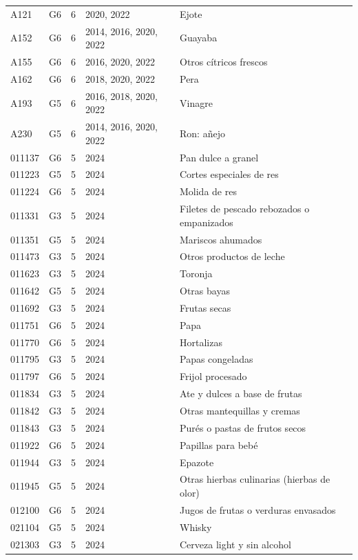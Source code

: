 \begin{table}[ht]
\begin{tabular}{llrll}
  A121 & G6 &   6 & 2020, 2022 & Ejote \\ 
  A152 & G6 &   6 & 2014, 2016, 2020, 2022 & Guayaba \\ 
  A155 & G6 &   6 & 2016, 2020, 2022 & Otros cítricos frescos \\ 
  A162 & G6 &   6 & 2018, 2020, 2022 & Pera \\ 
  A193 & G5 &   6 & 2016, 2018, 2020, 2022 & Vinagre \\ 
  A230 & G5 &   6 & 2014, 2016, 2020, 2022 & Ron: añejo \\ 
  011137 & G6 &   5 & 2024 & Pan dulce a granel \\ 
  011223 & G5 &   5 & 2024 & Cortes especiales de res \\ 
  011224 & G6 &   5 & 2024 & Molida de res \\ 
  011331 & G3 &   5 & 2024 & Filetes de pescado rebozados o empanizados \\ 
  011351 & G5 &   5 & 2024 & Mariscos ahumados \\ 
  011473 & G3 &   5 & 2024 & Otros productos de leche \\ 
  011623 & G3 &   5 & 2024 & Toronja \\ 
  011642 & G5 &   5 & 2024 & Otras bayas \\ 
  011692 & G3 &   5 & 2024 & Frutas secas \\ 
  011751 & G6 &   5 & 2024 & Papa \\ 
  011770 & G6 &   5 & 2024 & Hortalizas \\ 
  011795 & G3 &   5 & 2024 & Papas congeladas \\ 
  011797 & G6 &   5 & 2024 & Frijol procesado \\ 
  011834 & G3 &   5 & 2024 & Ate y dulces a base de frutas \\ 
  011842 & G3 &   5 & 2024 & Otras mantequillas y cremas \\ 
  011843 & G3 &   5 & 2024 & Purés o pastas de frutos secos \\ 
  011922 & G6 &   5 & 2024 & Papillas para bebé \\ 
  011944 & G3 &   5 & 2024 & Epazote \\ 
  011945 & G5 &   5 & 2024 & Otras hierbas culinarias (hierbas de olor) \\ 
  012100 & G6 &   5 & 2024 & Jugos de frutas o verduras envasados \\ 
  021104 & G5 &   5 & 2024 & Whisky \\ 
  021303 & G3 &   5 & 2024 & Cerveza light y sin alcohol \\ 

\end{tabular}
\end{table}
